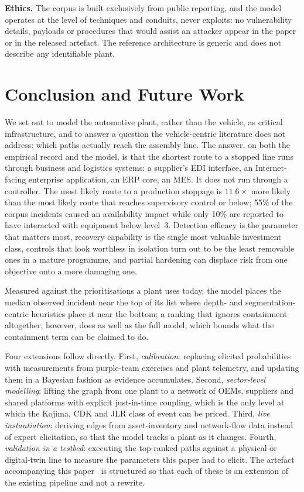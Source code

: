 \textbf{Ethics.} The corpus is built exclusively from public reporting, and the model operates at the level of techniques and conduits, never exploits: no vulnerability details, payloads or procedures that would assist an
attacker appear in the paper or in the released artefact. The reference
architecture is generic and does not describe any identifiable plant.

\section{Conclusion and Future Work}

We set out to model the automotive plant, rather than the vehicle, as critical
infrastructure, and to answer a question the vehicle-centric literature does
not address: which paths actually reach the assembly line. The answer, on both
the empirical record and the model, is that the shortest route to a stopped
line runs through business and logistics systems: a supplier's EDI
interface, an Internet-facing enterprise application, an ERP core, an MES. It
does not run through a controller. The most likely route to a production stoppage is
$11.6\times$ more likely than the most likely route that reaches supervisory
control or below; 55\% of the corpus incidents caused an availability impact
while only 10\% are reported to have interacted with equipment below level~3.
Detection efficacy is the parameter that matters most, recovery capability is
the single most valuable investment class, controls that look worthless in
isolation turn out to be the least removable ones in a mature programme, and
partial hardening can displace risk from one objective onto a more damaging
one.

Measured against the prioritisations a plant uses today, the model places the
median observed incident near the top of its list where depth- and
segmentation-centric heuristics place it near the bottom; a ranking that ignores
containment altogether, however, does as well as the full model, which bounds
what the containment term can be claimed to do.

Four extensions follow directly. First, \emph{calibration}: replacing elicited
probabilities with measurements from purple-team exercises and plant telemetry,
and updating them in a Bayesian fashion as evidence accumulates. Second,
\emph{sector-level modelling}: lifting the graph from one plant to a network of
OEMs, suppliers and shared platforms with explicit just-in-time coupling, which
is the only level at which the Kojima, CDK and JLR class of event can be priced.
Third, \emph{live instantiation}: deriving edges from asset-inventory and
network-flow data instead of expert elicitation, so that the model tracks
a plant as it changes. Fourth, \emph{validation in a testbed}: executing the
top-ranked paths against a physical or digital-twin line to measure the
parameters this paper had to elicit. The artefact accompanying this
paper~\cite{capmartifact} is structured so that each of these is an extension of the existing pipeline and not a rewrite.

